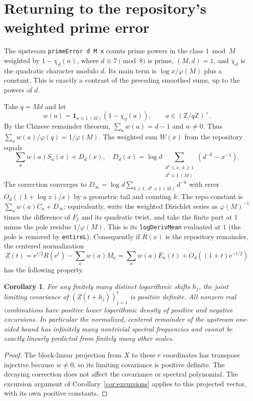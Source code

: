 \documentclass[11pt]{article}
\newtheorem{corollary}[theorem]{Corollary}
\theoremstyle{remark}\newtheorem{remark}[theorem]{Remark}
\newcommand{\Z}{\mathbb Z}
\newcommand{\e}{\mathrm e}
\newcommand{\ind}{\mathbf 1}
\begin{document}
\section{Returning to the repository's weighted prime error}
The upstream \texttt{primeError d M x} counts prime powers in the class $1\bmod M$ weighted by $1-\chi_d(n)$, where $d\equiv7\pmod8$ is prime, $(M,d)=1$, and $\chi_d$ is the quadratic character modulo $d$. Its main term is $\log x/\varphi(M)$ plus a constant. This is exactly a contrast of the preceding smoothed sums, up to the powers of $d$.

Take $q=Md$ and let
\[
 w(a)=\ind_{a\equiv1\ (M)}(1-\chi_d(a)),\qquad a\in(\Z/q\Z)^\times.
\]
By the Chinese remainder theorem, $\sum_a w(a)=d-1$ and $w\ne0$. Thus $\sum_a w(a)/\varphi(q)=1/\varphi(M)$. The weighted sum $W(x)$ from the repository equals
\[
 \sum_a w(a)S_a(x)+D_d(x),\quad
 D_d(x)=\log d\sum_{\substack{d^k\le x,\ k\ge1\\d^k\equiv1\ (M)}}(d^{-k}-x^{-1}).
\]
The correction converges to $D_\infty=\log d\sum_{k\ge1,\ d^k\equiv1\ (M)}d^{-k}$ with error $O_d((1+\log x)/x)$ by a geometric tail and counting $k$. The repo constant is $\sum_a w(a)C_a+D_\infty$: equivalently, write the weighted Dirichlet series as $\varphi(M)^{-1}$ times the difference of $F_\xi$ and its quadratic twist, and take the finite part at $1$ minus the pole residue $1/\varphi(M)$. This is its \texttt{logDerivMean} evaluated at $1$ (the pole is removed by \texttt{entireL}). Consequently if $R(x)$ is the repository remainder, the centered normalization
\[
 Z(t)=\e^{t/2}R(\e^t)-\sum_a w(a)M_a
 =\sum_a w(a)E_a(t)+O_d((1+t)\e^{-t/2})
\]
has the following property.
\begin{corollary}
For any finitely many distinct logarithmic shifts $h_j$, the joint limiting covariance of $(Z(t+h_j))_{j=1}^r$ is positive definite. All nonzero real combinations have positive lower logarithmic density of positive and negative excursions. In particular the normalized, centered remainder of the upstream one-sided bound has infinitely many nontrivial spectral frequencies and cannot be exactly linearly predicted from finitely many other scales.
\end{corollary}
\begin{proof}
The block-linear projection from $X$ to these $r$ coordinates has transpose injective because $w\ne0$, so its limiting covariance is positive definite. The decaying correction does not affect the covariance or spectral polynomial. The excursion argument of Corollary~\ref{cor:excursions} applies to this projected vector, with its own positive constants.
\end{proof}
\end{document}
